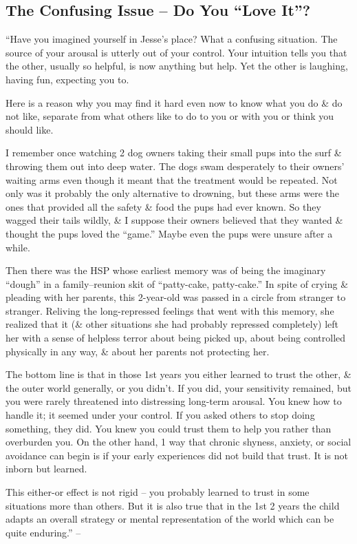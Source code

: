 \documentclass{article}
\numberwithin{equation}{section}
\begin{document}
\subsection{The Confusing Issue -- Do You ``Love It''?}
``Have you imagined yourself in Jesse's place? What a confusing situation. The source of your arousal is utterly out of your control. Your intuition tells you that the other, usually so helpful, is now anything but help. Yet the other is laughing, having fun, expecting you to.

Here is a reason why you may find it hard even now to know what you do \& do not like, separate from what others like to do to you or with you or think you should like.

I remember once watching 2 dog owners taking their small pups into the surf \& throwing them out into deep water. The dogs swam desperately to their owners' waiting arms even though it meant that the treatment would be repeated. Not only was it probably the only alternative to drowning, but these arms were the ones that provided all the safety \& food the pups had ever known. So they wagged their tails wildly, \& I suppose their owners believed that they wanted \& thought the pups loved the ``game.'' Maybe even the pups were unsure after a while.

Then there was the HSP whose earliest memory was of being the imaginary ``dough'' in a family--reunion skit of ``patty-cake, patty-cake.'' In spite of crying \& pleading with her parents, this 2-year-old was passed in a circle from stranger to stranger. Reliving the long-repressed feelings that went with this memory, she realized that it (\& other situations she had probably repressed completely) left her with a sense of helpless terror about being picked up, about being controlled physically in any way, \& about her parents not protecting her.

The bottom line is that in those 1st years you either learned to trust the other, \& the outer world generally, or you didn't. If you did, your sensitivity remained, but you were rarely threatened into distressing long-term arousal. You knew how to handle it; it seemed under your control. If you asked others to stop doing something, they did. You knew you could trust them to help you rather than overburden you. On the other hand, 1 way that chronic shyness, anxiety, or social avoidance can begin is if your early experiences did not build that trust. It is not inborn but learned.

This either-or effect is not rigid -- you probably learned to trust in some situations more than others. But it is also true that in the 1st 2 years the child adapts an overall strategy or mental representation of the world which can be quite enduring.'' -- \cite[pp. 104--105]{Aron2013}
\end{document}
